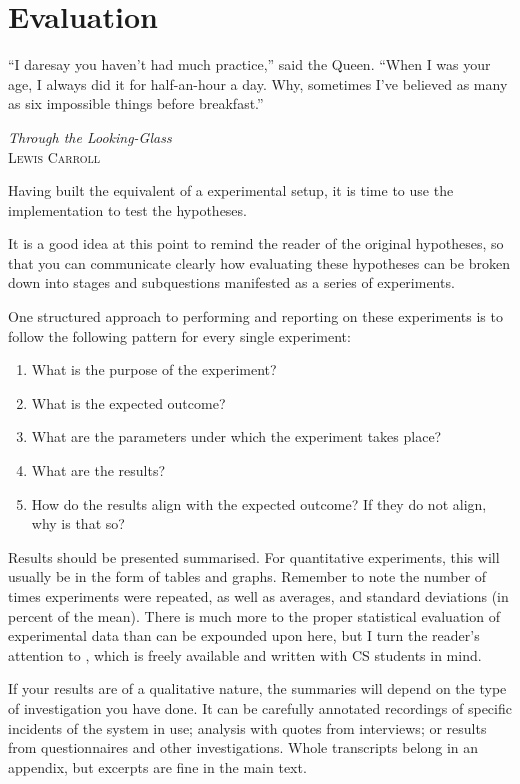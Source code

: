 \chapter{Evaluation}
\label{cha:evaluation}
\epigraph{``I daresay you haven't had much practice,'' said the
Queen. ``When I was your age, I always did it for half-an-hour a
day. Why, sometimes I've believed as many as six impossible things
before breakfast.''}{\textit{Through the Looking-Glass}\\\textsc{Lewis Carroll}}


Having built the equivalent of a experimental setup, it is time to use the
implementation to test the hypotheses.

It is a good idea at this point to remind the reader of the original
hypotheses, so that you can communicate clearly how evaluating these
hypotheses can be broken down into stages and subquestions manifested as a
series of experiments.

One structured approach to performing and reporting on these experiments is
to follow the following pattern for every single experiment:

\begin{enumerate}
\item What is the purpose of the experiment?
\item What is the expected outcome?
\item What are the parameters under which the experiment takes place?
\item What are the results?
\item How do the results align with the expected outcome? If they do not
  align, why is that so?
\end{enumerate}

Results should be presented summarised. For quantitative experiments, this
will usually be in the form of tables and graphs.  Remember to note the
number of times experiments were repeated, as well as averages, and standard
deviations (in percent of the mean).  There is much more to the proper
statistical evaluation of experimental data than can be expounded upon here,
but I turn the reader's attention to \citep{Downey2011:TSPASFP2011}, which
is freely available and written with CS students in mind.

If your results are of a qualitative nature, the summaries will depend on
the type of investigation you have done. It can be carefully annotated
recordings of specific incidents of the system in use; analysis with quotes
from interviews; or results from questionnaires and other investigations.
Whole transcripts belong in an appendix, but excerpts are fine in the main
text.



